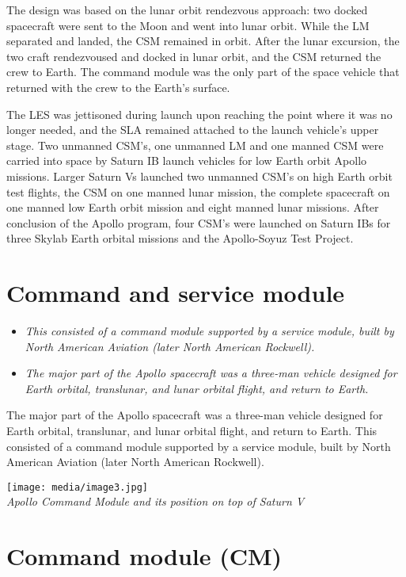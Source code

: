 The design was based on the lunar orbit rendezvous approach: two docked
spacecraft were sent to the Moon and went into lunar orbit. While the LM
separated and landed, the CSM remained in orbit. After the lunar
excursion, the two craft rendezvoused and docked in lunar orbit, and the
CSM returned the crew to Earth. The command module was the only part of
the space vehicle that returned with the crew to the Earth's surface.

The LES was jettisoned during launch upon reaching the point where it
was no longer needed, and the SLA remained attached to the launch
vehicle's upper stage. Two unmanned CSM's, one unmanned LM and one
manned CSM were carried into space by Saturn IB launch vehicles for low
Earth orbit Apollo missions. Larger Saturn Vs launched two unmanned
CSM's on high Earth orbit test flights, the CSM on one manned lunar
mission, the complete spacecraft on one manned low Earth orbit mission
and eight manned lunar missions. After conclusion of the Apollo program,
four CSM's were launched on Saturn IBs for three Skylab Earth orbital
missions and the Apollo-Soyuz Test Project.

\section{Command and service module}\label{command-and-service-module}

\begin{itemize}
\item
  \emph{This consisted of a command module supported by a service
  module, built by North American Aviation (later North American
  Rockwell).}
\item
  \emph{The major part of the Apollo spacecraft was a three-man vehicle
  designed for Earth orbital, translunar, and lunar orbital flight, and
  return to Earth.}
\end{itemize}

The major part of the Apollo spacecraft was a three-man vehicle designed
for Earth orbital, translunar, and lunar orbital flight, and return to
Earth. This consisted of a command module supported by a service module,
built by North American Aviation (later North American Rockwell).

\texttt{[image: media/image3.jpg]}\\
\emph{Apollo Command Module and its position on top of Saturn V}

\section{Command module (CM)}\label{command-module-cm}


